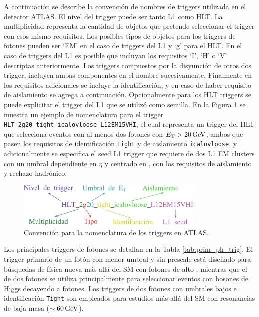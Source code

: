 A continuación se describe la convención de nombres de triggers utilizada en el detector ATLAS.
El nivel del trigger puede ser tanto L1 como HLT. La multiplicidad representa la cantidad de objetos que pretende seleccionar el trigger con esos mismo requisitos. Los posibles tipos de objetos para los triggers de fotones pueden ser `EM' en el caso de triggers del L1 y `g' para el HLT. En el caso de triggers del L1 es posible que incluyan los requisitos `I', `H' o `V' descriptas anteriormente. Los triggers compuestos por la disyunción de otros dos trigger, incluyen ambas componentes en el nombre sucesivamente. Finalmente en los requisitos adicionales se incluye la identificación, y en caso de haber requisito de aislamiento se agrega a continuación. Opcionalmente para los HLT triggers se puede explicitar el trigger del L1 que se utilizó como semilla. En la Figura \ref{fig:trigger_name} se muestra un ejemplo de nomenclatura para el trigger \texttt{HLT\_2g20\_tight\_icalovloose\_L12EM15VHI}, el cual representa un trigger del HLT que selecciona eventos con al menos dos fotones con $E_{\text{T}}>20\,\text{GeV}$, ambos que pasen los requisitos de identificación \texttt{Tight} y de aislamiento \texttt{icalovloose}, y adicionalmente se especifica el seed L1 trigger que requiere de dos L1 EM clusters con un umbral dependiente en $\eta$ y centrado en , con los requisitos de aislamiento y rechazo hadrónico.

\begin{figure}
  \centering
  \includegraphics[width=0.8\textwidth]{images/trigger/trigger_name.pdf}
  \caption{Convención para la nomenclatura de los triggers en ATLAS.}
  \label{fig:trigger_name}
\end{figure}

Los principales triggers de fotones se detallan en la Tabla \ref{tab:prim_ph_trig}. El trigger primario de un fotón con menor umbral y sin prescale 
está diseñado para búsquedas de física nueva más allá del SM con fotones de alto \ET, mientras que el de dos fotones se utiliza principalmente para seleccionar eventos con bosones de Higgs decayendo a fotones. Los triggers de dos fotones con umbrales bajos e identificación \texttt{Tight} son empleados para estudios más allá del SM con resonancias de baja masa ($\sim60\,\text{GeV}$).



